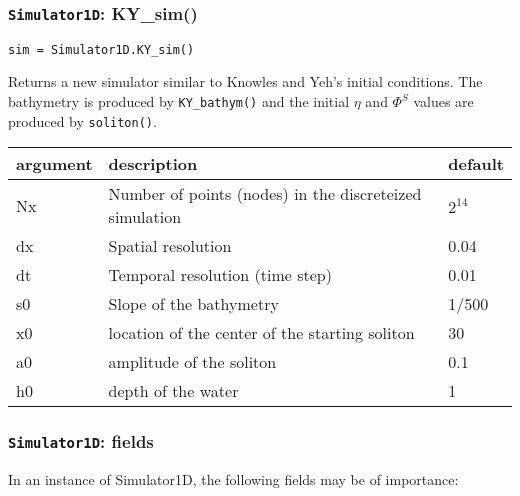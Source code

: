 \documentclass[10pt,a4paper]{article}
\newenvironment{optarglist}
    {\begin{center}
    \begin{tabular}{l|p{10cm}|l}
    argument & description & default\\
    \hline
    }
    { 
    \end{tabular} 
    \end{center}
    }
\begin{document}
\subsubsection{\texttt{Simulator1D}: KY\_sim()}
\texttt{sim = Simulator1D.KY\_sim()}

Returns a new simulator similar to Knowles and Yeh's
        initial conditions. The bathymetry is produced by \texttt{KY\_bathym()} and the initial $\eta$ and $\Phi^S$ values are produced by \texttt{soliton()}.

\begin{optarglist}
        Nx       & Number of points (nodes) in the discreteized simulation & $2^{14}$\\\hline
        dx        & Spatial resolution & 0.04 \\\hline
        dt        & Temporal resolution (time step) & 0.01 \\\hline
        s0        & Slope of the bathymetry & 1/500 \\\hline
        x0        & location of the center of the starting soliton & 30 \\\hline
        a0        & amplitude of the soliton & 0.1 \\\hline 
        h0        & depth of the water & 1 \\\hline
\end{optarglist}




\subsubsection{\texttt{Simulator1D}: fields}
In an instance of Simulator1D, the following fields may be of importance:
\end{document}
